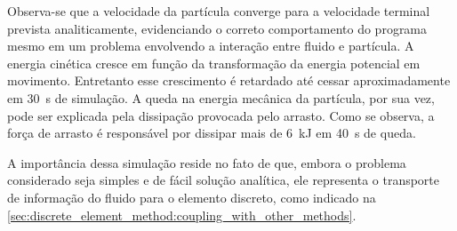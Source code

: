 Observa-se que a velocidade da partícula converge para a velocidade terminal prevista analiticamente, evidenciando o correto comportamento do programa mesmo em um problema envolvendo a interação entre fluido e partícula. A energia cinética cresce em função da transformação da energia potencial em movimento. Entretanto esse crescimento é retardado até cessar aproximadamente em \SI{30}{\second} de simulação. A queda na energia mecânica da partícula, por sua vez, pode ser explicada pela dissipação provocada pelo arrasto. Como se observa, a força de arrasto é responsável por dissipar mais de \SI{6}{\kilo\joule} em \SI{40}{\second} de queda.

A importância dessa simulação reside no fato de que, embora o problema considerado seja simples e de fácil solução analítica, ele representa o transporte de informação do fluido para o elemento discreto, como indicado na \cref{sec:discrete_element_method:coupling_with_other_methods}.